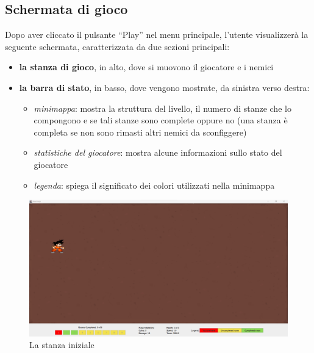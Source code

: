 \documentclass[a4paper,12pt]{report}
\begin{document}
\subsection*{Schermata di gioco}
Dopo aver cliccato il pulsante ``Play'' nel menu principale, l'utente visualizzerà la seguente schermata, caratterizzata da due sezioni principali:
\begin{itemize}
    \item \textbf{la stanza di gioco}, in alto, dove si muovono il giocatore e i nemici
    \item \textbf{la barra di stato}, in basso, dove vengono mostrate, da sinistra verso destra:
    \begin{itemize}
        \item \textit{minimappa}: mostra la struttura del livello, il numero di stanze che lo compongono e se tali stanze sono complete oppure no
        (una stanza è completa se non sono rimasti altri nemici da sconfiggere)
        \item \textit{statistiche del giocatore}: mostra alcune informazioni sullo stato del giocatore
        \item \textit{legenda}: spiega il significato dei colori utilizzati nella minimappa
    \end{itemize}
\end{itemize}

\begin{figure}[h]
\centering{}
\includegraphics[width=\textwidth]{img/emptyRoom.png}
\caption{La stanza iniziale}
\label{img/emptyRoom}
\end{figure}
\end{document}
